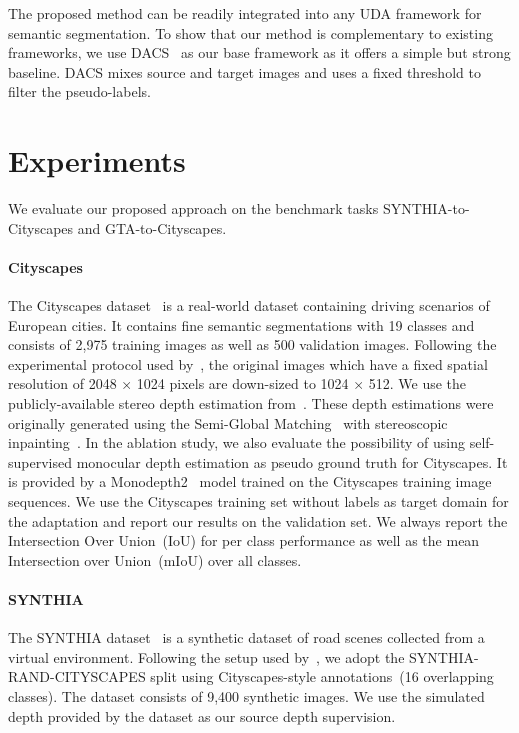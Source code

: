 \documentclass[10pt,twocolumn,letterpaper]{article}
\begin{document}
The proposed method can be readily integrated into any UDA framework for semantic segmentation. To show that our method is complementary to existing frameworks, we use DACS~\cite{tranheden2020dacs} as our base framework as it offers a simple but strong baseline. DACS  mixes source and target images and uses a fixed threshold to filter the pseudo-labels. 

\section{Experiments}
\label{sec:data}
 We evaluate our proposed approach on the benchmark tasks SYNTHIA-to-Cityscapes and GTA-to-Cityscapes.
\paragraph{Cityscapes} The Cityscapes dataset~\cite{Cordts2016Cityscapes} is a real-world dataset containing driving scenarios of European cities. It contains fine semantic segmentations with 19 classes and consists of 2,975 training images as well as 500 validation images. Following the experimental protocol used by~\cite{chen2019learning}, the original images which have a fixed spatial resolution of 2048 × 1024 pixels are down-sized to 1024 × 512.  We use the publicly-available stereo depth estimation from~\cite{sakaridis2018model}. These depth estimations were originally generated using the Semi-Global Matching~\cite{hirschmuller2005accurate} with stereoscopic inpainting~\cite{wang2008stereoscopic}. In the ablation study, we also evaluate the possibility of using self-supervised monocular depth estimation as pseudo ground truth for Cityscapes. It is provided by a Monodepth2~\cite{monodepth2} model trained on the Cityscapes training image sequences. We use the Cityscapes training set without labels as target domain for the adaptation and report our results on the validation set. We always report the Intersection Over Union~(IoU) for per class performance as well as the mean Intersection over Union~(mIoU) over all classes.

\paragraph{SYNTHIA} The SYNTHIA dataset~\cite{ros2016SYNTHIA} is a synthetic dataset of road scenes collected from a virtual environment. Following the setup used by~\cite{vu2019dada, chen2019learning}, we adopt the SYNTHIA-RAND-CITYSCAPES split using Cityscapes-style annotations~(16 overlapping classes). The dataset consists of 9,400 synthetic images. We use the simulated depth provided by the dataset as our source depth supervision. 
\end{document}
